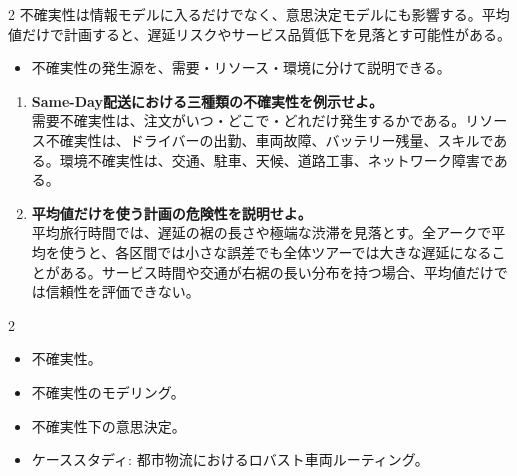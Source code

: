 \begin{multicols}{2}
不確実性は情報モデルに入るだけでなく、意思決定モデルにも影響する。平均値だけで計画すると、遅延リスクやサービス品質低下を見落とす可能性がある。\par
{}
\begin{itemize}
\item 不確実性の発生源を、需要・リソース・環境に分けて説明できる。
\end{itemize}
\begin{enumerate}
\item \textbf{Same-Day配送における三種類の不確実性を例示せよ。}\\需要不確実性は、注文がいつ・どこで・どれだけ発生するかである。リソース不確実性は、ドライバーの出勤、車両故障、バッテリー残量、スキルである。環境不確実性は、交通、駐車、天候、道路工事、ネットワーク障害である。
\item \textbf{平均値だけを使う計画の危険性を説明せよ。}\\平均旅行時間では、遅延の裾の長さや極端な渋滞を見落とす。全アークで平均を使うと、各区間では小さな誤差でも全体ツアーでは大きな遅延になることがある。サービス時間や交通が右裾の長い分布を持つ場合、平均値だけでは信頼性を評価できない。
\end{enumerate}
\end{multicols}

\clearpage
{}
\begin{multicols}{2}\scriptsize\raggedcolumns
{}
\begin{itemize}
\item 不確実性。
\item 不確実性のモデリング。
\item 不確実性下の意思決定。
\item ケーススタディ: 都市物流におけるロバスト車両ルーティング。
\end{itemize}
\end{multicols}

